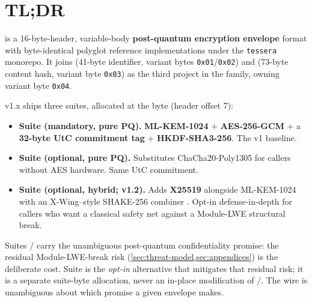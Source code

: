 \section*{TL;DR}

\pqcrypt{} is a 16-byte-header, variable-body \textbf{post-quantum encryption envelope} format with byte-identical polyglot reference implementations under the \texttt{tessera} monorepo. It joins \pqid{} (41-byte identifier, variant bytes \texttt{0x01}/\texttt{0x02}) and \pqhash{} (73-byte content hash, variant byte \texttt{0x03}) as the third project in the family, owning variant byte \texttt{0x04}.

v1.x ships three suites, allocated at the  byte (header offset 7):

\begin{itemize}
\item \textbf{Suite  (mandatory, pure PQ).} \textbf{ML-KEM-1024} \citep{fips203} + \textbf{AES-256-GCM} + a \textbf{32-byte UtC commitment tag} \citep{bellare2022commitment} + \textbf{HKDF-SHA3-256}. The v1 baseline.
\item \textbf{Suite  (optional, pure PQ).} Substitutes ChaCha20-Poly1305 for callers without AES hardware. Same UtC commitment.
\item \textbf{Suite  (optional, hybrid; v1.2).} Adds \textbf{X25519} \citep{rfc7748} alongside ML-KEM-1024 with an X-Wing--style SHAKE-256 combiner \citep{xwing-draft}. Opt-in defense-in-depth for callers who want a classical safety net against a Module-LWE structural break.
\end{itemize}

Suites / carry the unambiguous post-quantum confidentiality promise: the residual Module-LWE-break risk (\cref{sec:threat-model,sec:appendices}) is the deliberate cost. Suite  is the \emph{opt-in} alternative that mitigates that residual risk; it is a separate suite-byte allocation, never an in-place modification of /. The wire is unambiguous about which promise a given envelope makes.


